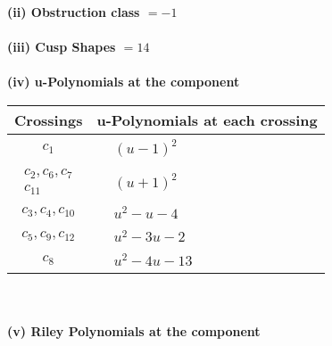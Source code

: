 \documentclass[1p]{elsarticle_modified}
\theoremstyle{definition}
\begin{document}
\flushleft \textbf{(ii) Obstruction class $= -1$}\\~\\
\flushleft \textbf{(iii) Cusp Shapes $= 14$}\\~\\
\newpage\renewcommand{\arraystretch}{1}
\flushleft \textbf{(iv) u-Polynomials at the component}\newline \\
\begin{tabular}{m{50pt}|m{274pt}}
Crossings & \hspace{64pt}u-Polynomials at each crossing \\
\hline $$\begin{aligned}c_{1}\end{aligned}$$&$\begin{aligned}
&(u-1)^2
\end{aligned}$\\
\hline $$\begin{aligned}c_{2},c_{6},c_{7}\\c_{11}\end{aligned}$$&$\begin{aligned}
&(u+1)^2
\end{aligned}$\\
\hline $$\begin{aligned}c_{3},c_{4},c_{10}\end{aligned}$$&$\begin{aligned}
&u^2- u-4
\end{aligned}$\\
\hline $$\begin{aligned}c_{5},c_{9},c_{12}\end{aligned}$$&$\begin{aligned}
&u^2-3 u-2
\end{aligned}$\\
\hline $$\begin{aligned}c_{8}\end{aligned}$$&$\begin{aligned}
&u^2-4 u-13
\end{aligned}$\\
\hline
\end{tabular}\\~\\
\newpage\renewcommand{\arraystretch}{1}
\flushleft \textbf{(v) Riley Polynomials at the component}\newline \\
\end{document}
